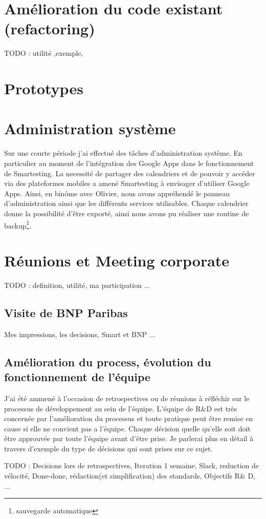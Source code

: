 \section{Amélioration du code existant (refactoring)}
TODO : utilité ,exemple, 

\section{Prototypes}

\section{Administration système}
Sur une courte période j'ai effectué des t\^aches d'administration système. En particulier au moment de l'intégration des Google Apps dans le fonctionnement de Smartesting. La necessité de partager des calendriers et de pouvoir y accéder via des plateformes mobiles a amené Smartesting à envisager d'utiliser Google Apps. Ainsi, en binôme avec Olivier, nous avons appréhendé le panneau d'administration ainsi que les différents services utilisables. Chaque calendrier donne la possibilité d'être exporté, ainsi nous avons pu réaliser une routine de backup\footnote{sauvegarde automatique}.

\section{Réunions et Meeting corporate}
TODO : definition, utilité, ma participation ...

\subsection{Visite de BNP Paribas}
Mes impressions, les decisions, Smart et BNP ...

\subsection{Amélioration du process, évolution du fonctionnement de l'équipe}
J'ai été ammené à l'occasion de retrospectives ou de réunions à réfléchir sur le processus de développement au sein de l'équipe. L'équipe de R\&D est très concernée par l'amélioration du processus et toute pratique peut être remise en cause si elle ne convient pas a l'équipe. Chaque décision quelle qu'elle soit doit être approuvée par toute l'équipe avant d'être prise. Je parlerai plus en détail à travers d'exemple du type de décisions qui sont prises sur ce sujet.



TODO : Decisions lors de retrospectives, Iteration 1 semaine, Slack, reduction de vélocité, Done-done, rédaction(et simplification) des standards, Objectifs R\& D, ...